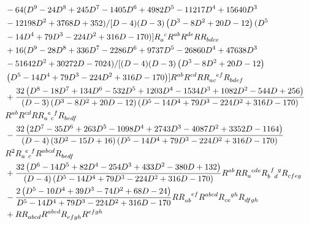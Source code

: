 \documentclass[a4paper,11pt]{article}
\begin{document}
\begin{subequations}
\begin{align}
        & \quad -64 (D^9-24 D^8+245 D^7-1405 D^6+4982 D^5-11217 D^4+15640 D^3\nonumber\\
        &\quad-12198 D^2+3768 D+352)/[D-4) (D-3) \left(D^3-8 D^2+20 D-12\right) (D^5\nonumber\\
        &\quad-14 D^4+79 D^3-224 D^2+316 D-170)]R\indices{_a^c}R\indices{^a^b}R\indices{^d^e}RR\indices{_b_d_c_e}\nonumber\\
        & \quad +16 (D^9-28 D^8+336 D^7-2286 D^6+9737 D^5-26860 D^4+47638 D^3\nonumber\\
        &\quad-51642 D^2+30272 D-7024)/[(D-4) (D-3) \left(D^3-8 D^2+20 D-12\right) \nonumber\\
        &\quad\left(D^5-14 D^4+79 D^3-224 D^2+316 D-170\right)]R\indices{^a^b}R\indices{^c^d}RR\indices{_a_c^e^f}R\indices{_b_d_e_f}\nonumber\\
        & \quad +\frac{32 \left(D^8-18 D^7+134 D^6-532 D^5+1203 D^4-1534 D^3+1082 D^2-544 D+256\right)}{(D-3) \left(D^3-8 D^2+20 D-12\right) \left(D^5-14 D^4+79 D^3-224 D^2+316 D-170\right)}\nonumber\\
        &\quad R\indices{^a^b}R\indices{^c^d}RR\indices{_a^e_c^f}R\indices{_b_e_d_f}\nonumber\\
        & \quad -\frac{32 \left(2 D^7-35 D^6+263 D^5-1098 D^4+2743 D^3-4087 D^2+3352 D-1164\right)}{(D-4) \left(3 D^2-15 D+16\right) \left(D^5-14 D^4+79 D^3-224 D^2+316 D-170\right)}\nonumber\\
        &\quad R^2R\indices{_a^e_c^f}R\indices{^a^b^c^d}R\indices{_b_e_d_f}\nonumber\\
        & \quad +\frac{32 \left(D^6-14 D^5+82 D^4-254 D^3+433 D^2-380 D+132\right)}{(D-4) \left(D^5-14 D^4+79 D^3-224 D^2+316 D-170\right)}R\indices{^a^b}RR\indices{_a^c^d^e}R\indices{_b^f_d^g}R\indices{_c_f_e_g}\nonumber\\
        & \quad -\frac{2 \left(D^5-10 D^4+39 D^3-74 D^2+68 D-24\right)}{D^5-14 D^4+79 D^3-224 D^2+316 D-170}RR\indices{_a_b^e^f}R\indices{^a^b^c^d}R\indices{_c_e^g^h}R\indices{_d_f_g_h}\nonumber\\
        & \quad +RR\indices{_a_b_c_d}R\indices{^a^b^c^d}R\indices{_e_f_g_h}R\indices{^e^f^g^h}\label{eq:quintic-qtg-6}
    \end{align}
\end{subequations}
\end{document}
